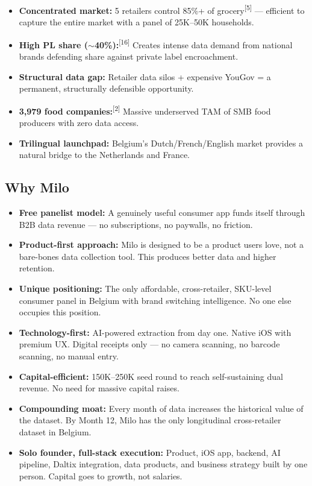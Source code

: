\documentclass[11pt,a4paper]{article}
\begin{document}
\begin{itemize}[leftmargin=1.5em, itemsep=4pt]
  \item \textbf{Concentrated market:} 5 retailers control 85\%+ of grocery\textsuperscript{[5]} --- efficient to capture the entire market with a panel of 25K--50K households.
  \item \textbf{High PL share ($\sim$40\%):}\textsuperscript{[16]} Creates intense data demand from national brands defending share against private label encroachment.
  \item \textbf{Structural data gap:} Retailer data silos + expensive YouGov = a permanent, structurally defensible opportunity.
  \item \textbf{3,979 food companies:}\textsuperscript{[2]} Massive underserved TAM of SMB food producers with zero data access.
  \item \textbf{Trilingual launchpad:} Belgium's Dutch/French/English market provides a natural bridge to the Netherlands and France.
\end{itemize}

\subsection{Why Milo}

\begin{itemize}[leftmargin=1.5em, itemsep=4pt]
  \item \textbf{Free panelist model:} A genuinely useful consumer app funds itself through B2B data revenue --- no subscriptions, no paywalls, no friction.
  \item \textbf{Product-first approach:} Milo is designed to be a product users love, not a bare-bones data collection tool. This produces better data and higher retention.
  \item \textbf{Unique positioning:} The only affordable, cross-retailer, SKU-level consumer panel in Belgium with brand switching intelligence. No one else occupies this position.
  \item \textbf{Technology-first:} AI-powered extraction from day one. Native iOS with premium UX. Digital receipts only --- no camera scanning, no barcode scanning, no manual entry.
  \item \textbf{Capital-efficient:} \texteuro{}150K--250K seed round to reach self-sustaining dual revenue. No need for massive capital raises.
  \item \textbf{Compounding moat:} Every month of data increases the historical value of the dataset. By Month 12, Milo has the only longitudinal cross-retailer dataset in Belgium.
  \item \textbf{Solo founder, full-stack execution:} Product, iOS app, backend, AI pipeline, Daltix integration, data products, and business strategy built by one person. Capital goes to growth, not salaries.
\end{itemize}
\end{document}
